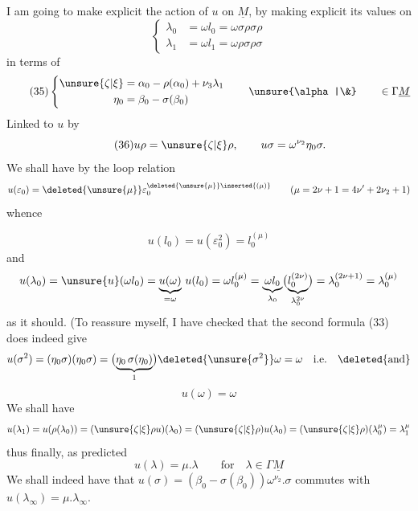 I am going to make explicit the action of $u$ on
$\underline M$, by making explicit its values on
\[
\left\{\begin{aligned}
\lambda_0&=\omega l_0=\omega\sigma\rho\sigma\rho\\
\lambda_1&=\omega l_1=\omega\rho\sigma\rho\sigma
\end{aligned}\right.
\]
in terms of 
\[
\tag{35}
\left\{\begin{aligned}
\unsure{\zeta|\xi}&=\alpha_0-\rho(\alpha_0)+\nu_3\lambda_1\\
\eta_0&=\beta_0-\sigma(\beta_0)
\end{aligned}\right.
\qquad\unsure{\alpha|\&}\qquad\in\Gamma\underline M
\]
Linked to $u$ by
\[
\tag{36}
u\rho=\unsure{\zeta|\xi}\rho,\qquad
u\sigma=\omega^{\nu_2}\eta_0\sigma.
\]
We shall have  by the loop relation
\[
u(\varepsilon_0)=\deleted{\unsure{\mu}}\varepsilon_0^{\deleted{\unsure{\mu}}\inserted{(\mu)}}
\qquad(\mu=2\nu+1=4\nu'+2\nu_2+1)
\]
whence


\[
u(l_0)=u(\varepsilon_0^2)=l_0^{(\mu)}
\]
and
\[
u(\lambda_0)=\unsure{u}(\omega l_0)
=\underbrace{u(\omega)}_{=\omega}\,u(l_0)
=\omega l_0^{(\mu)}
=\underbrace{\omega l_0}_{\lambda_0}
 \bigl(\underbrace{l_0^{(2\nu)}}_{\lambda_0^{2\nu}}\bigr)
=\lambda_0^{(2\nu+1)}=\lambda_0^{(\mu)}
\]
as it should. (To reassure myself, I have checked that the second formula (33) does indeed give
\[
u(\sigma^2)=(\eta_0\sigma)(\eta_0\sigma)
=\bigl(\underbrace{\eta_0\,\sigma(\eta_0)}_{1}\bigr)
 \deleted{\unsure{\sigma^2}}\omega=\omega
\quad\text{i.e.}\quad\deleted{\text{and}}
\]
\[
\tag{37} u(\omega)=\omega
\]
We shall have
\[
u(\lambda_1)=u(\rho(\lambda_0))
=(\unsure{\zeta|\xi}\rho u)(\lambda_0)
=(\unsure{\zeta|\xi}\rho)u(\lambda_0)
=(\unsure{\zeta|\xi}\rho)(\lambda_0^\mu)=\lambda_1^\mu
\]
thus finally, as predicted
\[
\tag{38} u(\lambda)=\mu.\lambda\qquad\text{for}\quad\lambda\in\Gamma\underline M
\]
We shall indeed have that $u(\sigma)=(\beta_0-\sigma(\beta_0))\omega^{\nu_2}.\sigma$
commutes with $u(\lambda_\infty)=\mu.\lambda_\infty$.

